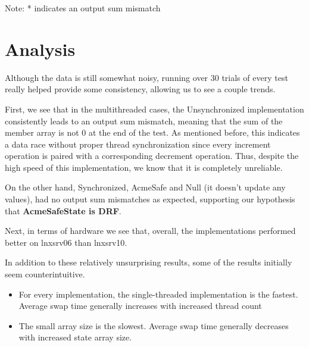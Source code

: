 \begin{table} [!htbp]
\centering
\caption{lnxsrv10: Average Swap Time vs. State Array Size}
\end{table}

Note: * indicates an output sum mismatch

\section{Analysis}

Although the data is still somewhat noisy, running over 30 trials of every test
really helped provide some consistency, allowing us to see a couple trends.

First, we see that in the multithreaded cases, the Unsynchronized implementation consistently leads
to an output sum mismatch, meaning that the sum of the member array is not 0 
at the end of the test. As mentioned before, this indicates a data race without 
proper thread synchronization since every increment operation is paired with a
corresponding decrement operation. Thus, despite the high speed of this implementation,
we know that it is completely unreliable.

On the other hand, Synchronized, AcmeSafe and Null (it doesn't update any values), had no output
sum mismatches as expected, supporting our hypothesis that \textbf{AcmeSafeState is DRF}. 

Next, in terms of hardware we see that, overall, the implementations performed better on lnxsrv06 than lnxsrv10. 

In addition to these relatively unsurprising results, some of the results initially seem counterintuitive. 

\begin{itemize}
\item For every implementation, the single-threaded implementation is the fastest. Average swap time generally increases with increased thread count
\item The small array size is the slowest. Average swap time generally decreases with increased state array size.
\end{itemize}

